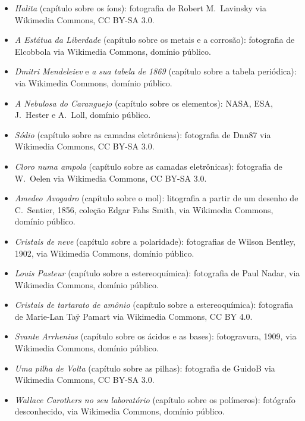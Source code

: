 \begin{itemize}
        Congress, via Wikimedia Commons, domínio público.
  \item \emph{Halita} (capítulo sobre os íons): fotografia de Robert
        M.~Lavinsky via Wikimedia Commons, CC BY-SA 3.0.
  \item \emph{A Estátua da Liberdade} (capítulo sobre os metais e a
        corrosão): fotografia de Elcobbola via Wikimedia Commons,
        domínio público.
  \item \emph{Dmitri Mendeleiev} e \emph{a sua tabela de 1869}
        (capítulo sobre a tabela periódica): via Wikimedia Commons,
        domínio público.
  \item \emph{A Nebulosa do Caranguejo} (capítulo sobre os elementos):
        NASA, ESA, J.~Hester e A.~Loll, domínio público.
  \item \emph{Sódio} (capítulo sobre as camadas eletrônicas):
        fotografia de Dnn87 via Wikimedia Commons, CC BY-SA 3.0.
  \item \emph{Cloro numa ampola} (capítulo sobre as camadas
        eletrônicas): fotografia de W.~Oelen via Wikimedia Commons,
        CC BY-SA 3.0.
  \item \emph{Amedeo Avogadro} (capítulo sobre o mol): litografia a
        partir de um desenho de C.~Sentier, 1856, coleção Edgar Fahs
        Smith, via Wikimedia Commons, domínio público.
  \item \emph{Cristais de neve} (capítulo sobre a polaridade):
        fotografias de Wilson Bentley, 1902, via Wikimedia Commons,
        domínio público.
  \item \emph{Louis Pasteur} (capítulo sobre a estereoquímica):
        fotografia de Paul Nadar, via Wikimedia Commons, domínio
        público.
  \item \emph{Cristais de tartarato de amônio} (capítulo sobre a
        estereoquímica): fotografia de Marie-Lan Taÿ Pamart via
        Wikimedia Commons, CC BY 4.0.
  \item \emph{Svante Arrhenius} (capítulo sobre os ácidos e as bases):
        fotogravura, 1909, via Wikimedia Commons, domínio público.
  \item \emph{Uma pilha de Volta} (capítulo sobre as pilhas):
        fotografia de GuidoB via Wikimedia Commons, CC BY-SA 3.0.
  \item \emph{Wallace Carothers no seu laboratório} (capítulo sobre os
        polímeros): fotógrafo desconhecido, via Wikimedia Commons,
        domínio público.
\end{itemize}

